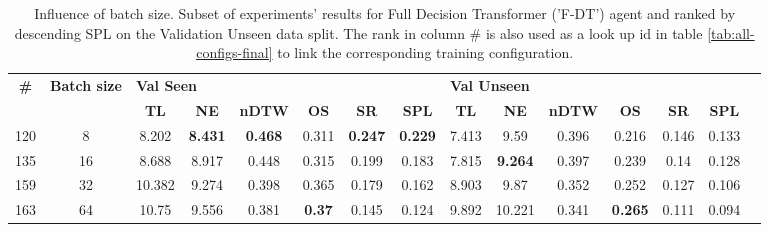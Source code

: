 \begin{table}
\centering
\caption{\label{tab:f_dt_batch_test}Influence of batch size. Subset of experiments' results for Full Decision Transformer ('F-DT') agent and ranked by descending SPL on the Validation Unseen data split. The rank in column \# is also used as a look up id in table \ref{tab:all-configs-final} to link the corresponding training configuration.}
\begin{tabular}{@{\hskip3pt}c@{\hskip3pt}c@{\hskip3pt}c@{\hskip3pt}c@{\hskip3pt}c@{\hskip3pt}c@{\hskip3pt}c@{\hskip3pt}c@{\hskip3pt}c@{\hskip3pt}c@{\hskip3pt}c@{\hskip3pt}c@{\hskip3pt}c@{\hskip3pt}c@{\hskip3pt}c}
\toprule
\textbf{\#} & \textbf{Batch size} & \multicolumn{6}{l}{\textbf{Val Seen}} & \multicolumn{6}{l}{\textbf{Val Unseen}} \\
 \textbf{~} &          \textbf{~} &       \textbf{TL} &     \textbf{NE} &   \textbf{nDTW} &    \textbf{OS} &     \textbf{SR} &    \textbf{SPL} &         \textbf{TL} &     \textbf{NE} & \textbf{nDTW} &     \textbf{OS} & \textbf{SR} & \textbf{SPL} \\
\midrule
        120 &                   8 &             8.202 &  \textbf{8.431} &  \textbf{0.468} &          0.311 &  \textbf{0.247} &  \textbf{0.229} &               7.413 &            9.59 &         0.396 &           0.216 &       0.146 &        0.133 \\
        135 &                  16 &             8.688 &           8.917 &           0.448 &          0.315 &           0.199 &           0.183 &               7.815 &  \textbf{9.264} &         0.397 &           0.239 &        0.14 &        0.128 \\
        159 &                  32 &            10.382 &           9.274 &           0.398 &          0.365 &           0.179 &           0.162 &               8.903 &            9.87 &         0.352 &           0.252 &       0.127 &        0.106 \\
        163 &                  64 &             10.75 &           9.556 &           0.381 &  \textbf{0.37} &           0.145 &           0.124 &               9.892 &          10.221 &         0.341 &  \textbf{0.265} &       0.111 &        0.094 \\
\bottomrule
\end{tabular}
\end{table}
